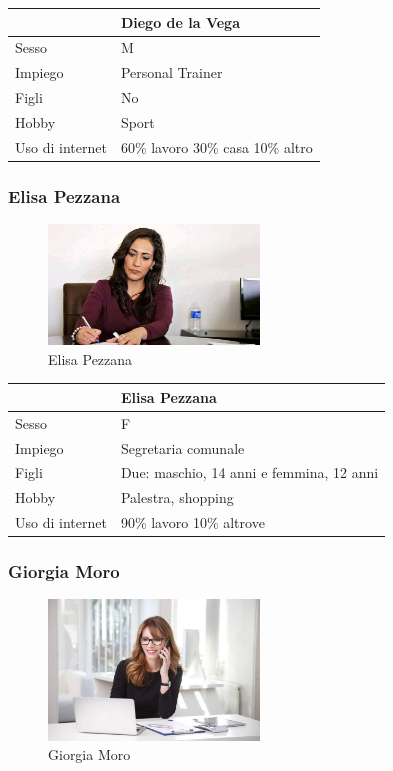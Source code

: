 \documentclass[12pt,italian,]{report}
\begin{document}
\begin{longtable}[]{@{}ll@{}}
\toprule
& Diego de la Vega\tabularnewline
\midrule
\endhead
Sesso & M\tabularnewline
Impiego & Personal Trainer\tabularnewline
Figli & No\tabularnewline
Hobby & Sport\tabularnewline
Uso di internet & 60\% lavoro 30\% casa 10\% altro\tabularnewline
\bottomrule
\end{longtable}

\hypertarget{elisa-pezzana}{%
\subsubsection{Elisa Pezzana}\label{elisa-pezzana}}

\begin{figure}[h]
\centering
\includegraphics[width=0.5\textwidth,height=\textheight]{img/elisa.jpg}
\caption{Elisa Pezzana}
\end{figure}

\begin{longtable}[]{@{}ll@{}}
\toprule
& Elisa Pezzana\tabularnewline
\midrule
\endhead
Sesso & F\tabularnewline
Impiego & Segretaria comunale\tabularnewline
Figli & Due: maschio, 14 anni e femmina, 12 anni\tabularnewline
Hobby & Palestra, shopping\tabularnewline
Uso di internet & 90\% lavoro 10\% altrove\tabularnewline
\bottomrule
\end{longtable}

\hypertarget{giorgia-moro}{%
\subsubsection{Giorgia Moro}\label{giorgia-moro}}

\begin{figure}[h]
\centering
\includegraphics[width=0.5\textwidth,height=\textheight]{img/giorgia.jpg}
\caption{Giorgia Moro}
\end{figure}
\end{document}
